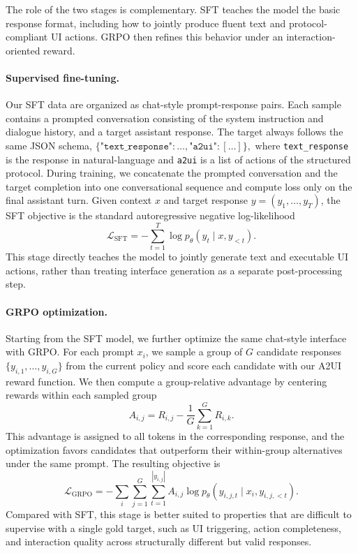 The role of the two stages is complementary. SFT teaches the model the basic response format, including how to jointly produce fluent text and protocol-compliant UI actions. GRPO then refines this behavior under an interaction-oriented reward.

\paragraph{Supervised fine-tuning.}
Our SFT data are organized as chat-style prompt-response pairs. Each sample contains a prompted conversation consisting of the system instruction and dialogue history, and a target assistant response. The target always follows the same JSON schema,
\(
\{\texttt{"text\_response"}: \ldots, \texttt{"a2ui"}: [\ldots]\},
\)
where \texttt{text\_response} is the response in natural-language and \texttt{a2ui} is a list of actions of the structured protocol. During training, we concatenate the prompted conversation and the target completion into one conversational sequence and compute loss only on the final assistant turn. Given context $x$ and target response $y=(y_1,\dots,y_T)$, the SFT objective is the standard autoregressive negative log-likelihood
\[
\mathcal{L}_{\mathrm{SFT}}
=
-\sum_{t=1}^{T}\log p_{\theta}(y_t \mid x, y_{<t}).
\]
This stage directly teaches the model to jointly generate text and executable UI actions, rather than treating interface generation as a separate post-processing step.

\paragraph{GRPO optimization.}
Starting from the SFT model, we further optimize the same chat-style interface with GRPO. For each prompt $x_i$, we sample a group of $G$ candidate responses $\{y_{i,1}, \dots, y_{i,G}\}$ from the current policy and score each candidate with our A2UI reward function. We then compute a group-relative advantage by centering rewards within each sampled group
\[
A_{i,j}
=
R_{i,j}
-
\frac{1}{G}\sum_{k=1}^{G} R_{i,k}.
\]
This advantage is assigned to all tokens in the corresponding response, and the optimization favors candidates that outperform their within-group alternatives under the same prompt. The resulting objective is
\[
\mathcal{L}_{\mathrm{GRPO}}
=
-\sum_i \sum_{j=1}^{G}\sum_{t=1}^{|y_{i,j}|}
A_{i,j}
\log p_{\theta}(y_{i,j,t} \mid x_i, y_{i,j,<t}).
\]
Compared with SFT, this stage is better suited to properties that are difficult to supervise with a single gold target, such as UI triggering, action completeness, and interaction quality across structurally different but valid responses.

